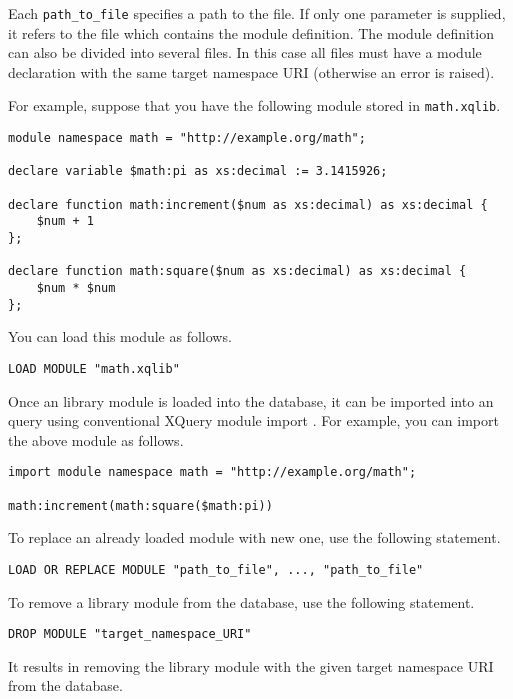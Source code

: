 \documentclass[a4paper,12pt]{article}
\begin{document}
Each \verb!path_to_file! specifies a path to the file. If only one parameter is
supplied, it refers to the file which contains the module definition. The module
definition can also be divided into several files. In this case all files must
have a module declaration with the same target namespace URI (otherwise an error
is raised).

For example, suppose that you have the following module stored in
\verb!math.xqlib!.

\begin{verbatim}
module namespace math = "http://example.org/math";

declare variable $math:pi as xs:decimal := 3.1415926;

declare function math:increment($num as xs:decimal) as xs:decimal {
    $num + 1
};

declare function math:square($num as xs:decimal) as xs:decimal {
    $num * $num
};
\end{verbatim}

You can load this module as follows.

\begin{verbatim}
LOAD MODULE "math.xqlib"
\end{verbatim}

Once an library module is loaded into the database, it can be imported into an
query using conventional XQuery module import \cite{paper:query-language}. For
example, you can import the above module as follows.

\begin{verbatim}
import module namespace math = "http://example.org/math";

math:increment(math:square($math:pi))

\end{verbatim}


To replace an already loaded module with new one, use the following statement.

\begin{verbatim}
LOAD OR REPLACE MODULE "path_to_file", ..., "path_to_file"
\end{verbatim}

To remove a library module from the database, use the following statement.

\begin{verbatim}
DROP MODULE "target_namespace_URI"
\end{verbatim}

It results in removing the library module with the given target namespace URI
from the database.
\end{document}
